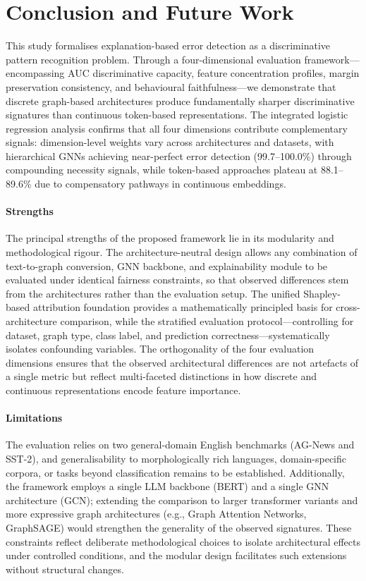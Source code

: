 \documentclass[preprint, times, review, 10pt]{elsarticle}
\begin{document}
\section{Conclusion and Future Work}

This study formalises explanation-based error detection as a discriminative pattern recognition problem. Through a four-dimensional evaluation framework---encompassing AUC discriminative capacity, feature concentration profiles, margin preservation consistency, and behavioural faithfulness---we demonstrate that discrete graph-based architectures produce fundamentally sharper discriminative signatures than continuous token-based representations. The integrated logistic regression analysis confirms that all four dimensions contribute complementary signals: dimension-level weights vary across architectures and datasets, with hierarchical GNNs achieving near-perfect error detection (99.7--100.0\%) through compounding necessity signals, while token-based approaches plateau at 88.1--89.6\% due to compensatory pathways in continuous embeddings.

\paragraph{\textbf{Strengths}}
The principal strengths of the proposed framework lie in its modularity and methodological rigour. The architecture-neutral design allows any combination of text-to-graph conversion, GNN backbone, and explainability module to be evaluated under identical fairness constraints, so that observed differences stem from the architectures rather than the evaluation setup. The unified Shapley-based attribution foundation provides a mathematically principled basis for cross-architecture comparison, while the stratified evaluation protocol---controlling for dataset, graph type, class label, and prediction correctness---systematically isolates confounding variables. The orthogonality of the four evaluation dimensions ensures that the observed architectural differences are not artefacts of a single metric but reflect multi-faceted distinctions in how discrete and continuous representations encode feature importance.

\paragraph{\textbf{Limitations}}
The evaluation relies on two general-domain English benchmarks (AG-News and SST-2), and generalisability to morphologically rich languages, domain-specific corpora, or tasks beyond classification remains to be established. Additionally, the framework employs a single LLM backbone (BERT) and a single GNN architecture (GCN); extending the comparison to larger transformer variants and more expressive graph architectures (e.g., Graph Attention Networks, GraphSAGE) would strengthen the generality of the observed signatures. These constraints reflect deliberate methodological choices to isolate architectural effects under controlled conditions, and the modular design facilitates such extensions without structural changes.
\end{document}
